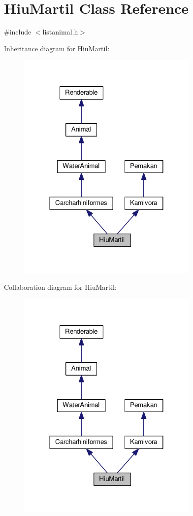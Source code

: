 \hypertarget{classHiuMartil}{}\section{Hiu\+Martil Class Reference}
\label{classHiuMartil}


{\ttfamily \#include $<$listanimal.\+h$>$}



Inheritance diagram for Hiu\+Martil\+:
\nopagebreak
\begin{figure}[H]
\begin{center}
\leavevmode
\includegraphics[width=252pt]{classHiuMartil__inherit__graph}
\end{center}
\end{figure}


Collaboration diagram for Hiu\+Martil\+:
\nopagebreak
\begin{figure}[H]
\begin{center}
\leavevmode
\includegraphics[width=252pt]{classHiuMartil__coll__graph}
\end{center}
\end{figure}
